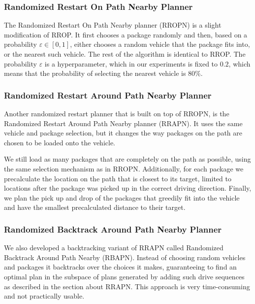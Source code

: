 \subsubsection{Randomized Restart On Path Nearby Planner}\label{rropn}

The Randomized Restart On Path Nearby planner (RROPN)
is a slight modification of RROP.
It first chooses a package randomly and then,
based on a probability $\varepsilon \in [0, 1]$,
either chooses a random vehicle that the package fits into,
or the nearest such vehicle.
The rest of the algorithm is identical to RROP.
The probability $\varepsilon$ is a hyperparameter,
which in our experiments is fixed to $0.2$,
which means that the probability of selecting the nearest vehicle is 80\%.

\subsubsection{Randomized Restart Around Path Nearby Planner}\label{rrapn}

Another randomized restart planner that is built on top of RROPN,
is the Randomized Restart Around Path Nearby planner (RRAPN).
It uses the same vehicle and package selection,
but it changes the way packages on the path are chosen to be loaded
onto the vehicle.

We still load as many packages that are completely on the path
as possible, using the same selection mechanism as in RROPN.
Additionally, for each package we precalculate
the location on the path that is closest to its target,
limited to locations after the package was picked up
in the correct driving direction.
Finally, we plan the pick up and drop of the
packages that greedily fit into the vehicle and
have the smallest precalculated distance to their target.

\subsubsection{Randomized Backtrack Around Path Nearby Planner}\label{rbapn}

We also developed a backtracking variant of RRAPN
called Randomized Backtrack Around Path Nearby (RBAPN).
Instead of choosing random vehicles and packages
it backtracks over the choices it makes,
guaranteeing to find an optimal
plan in the subspace of plans
generated by adding such drive sequences as described in
the section about RRAPN. This approach is very
time-consuming and not practically usable.

